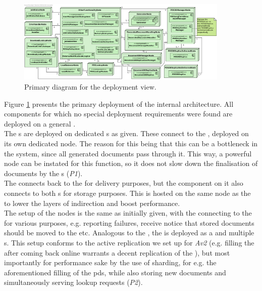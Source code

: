 \begin{figure}
    \centering
    \includegraphics[width=0.9\textwidth]{figures/Deployment.png}
    \caption{Primary diagram for the deployment view.}\label{fig:depl_primary}
\end{figure}


Figure \ref{fig:depl_primary} presents the primary deployment of the internal architecture. All components for which no special deployment requirements were found are deployed on a general .\\
The s are deployed on dedicated s as given. These connect to the , deployed on its own dedicated node. The reason for this being that this  can be a bottleneck in the system, since all generated documents pass through it. This way, a powerful node can be instated for this function, so it does not slow down the finalisation of documents by the s (\emph{P1}).\\
The  connects back to the  for delivery purposes, but the  component on it also connects to both s for storage purposes. This  is hosted on the same node as the  to lower the layers of indirection and boost performance.\\
The setup of the  nodes is the same as initially given, with the  connecting to the  for various purposes, e.g. reporting  failures, receive notice that stored documents should be moved to the  etc.
Analogous to the , the  is deployed as a  and multiple s. This setup conforms to the active replication we set up for \emph{Av2} (e.g. filling the  after coming back online warrants a decent replication of the ), but most importantly for performance sake by the use of sharding, for e.g. the aforementioned filling of the pds, while also storing new documents and simultaneously serving lookup requests (\emph{P2}).\\
